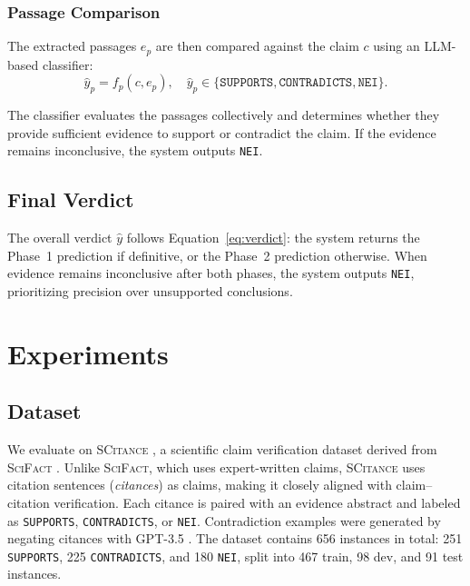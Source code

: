 \documentclass{article}
\theoremstyle{plain}
\theoremstyle{definition}
\theoremstyle{remark}
\begin{document}
\subsubsection{Passage Comparison}
\label{sec:passage_comparison}

The extracted passages $e_p$ are then compared against the claim $c$ using an LLM-based classifier:
\begin{equation}
\hat{y}_p = f_p(c, e_p), \quad \hat{y}_p \in \{\texttt{SUPPORTS}, \texttt{CONTRADICTS}, \texttt{NEI}\}.
\end{equation}

The classifier evaluates the passages collectively and determines whether they provide sufficient evidence to support or contradict the claim. If the evidence remains inconclusive, the system outputs \texttt{NEI}.


\subsection{Final Verdict}
\label{sec:final_verdict}

The overall verdict $\hat{y}$ follows Equation~\ref{eq:verdict}: the system returns the Phase~1 prediction if definitive, or the Phase~2 prediction otherwise. When evidence remains inconclusive after both phases, the system outputs \texttt{NEI}, prioritizing precision over unsupported conclusions.

\section{Experiments}

\subsection{Dataset}
\label{sec:dataset}

We evaluate on \textsc{SCitance} \cite{alvarez2024zero}, a scientific claim verification dataset derived from \textsc{SciFact} \cite{wadden2020fact}. Unlike \textsc{SciFact}, which uses expert-written claims, \textsc{SCitance} uses citation sentences (\textit{citances}) as claims, making it closely aligned with claim--citation verification. Each citance is paired with an evidence abstract and labeled as \texttt{SUPPORTS}, \texttt{CONTRADICTS}, or \texttt{NEI}. Contradiction examples were generated by negating citances with GPT-3.5 \cite{alvarez2024zero}. The dataset contains 656 instances in total: 251 \texttt{SUPPORTS}, 225 \texttt{CONTRADICTS}, and 180 \texttt{NEI}, split into 467 train, 98 dev, and 91 test instances.
\end{document}

